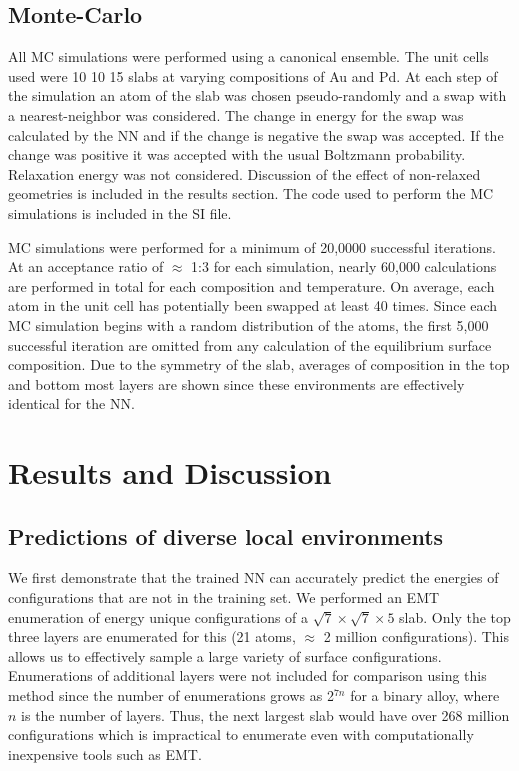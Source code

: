 \documentclass[12pt]{cmuthesis}
\begin{document}
\subsection{Monte-Carlo}
\label{sec:orgdf83274}
All MC simulations were performed using a canonical ensemble. The unit cells used were 10 \texttimes{} 10 \texttimes{} 15 slabs at varying compositions of Au and Pd. At each step of the simulation an atom of the slab was chosen pseudo-randomly and a swap with a nearest-neighbor was considered.  The change in energy for the swap was calculated by the NN and if the change is negative the swap was accepted. If the change was positive it was accepted with the usual Boltzmann probability. Relaxation energy was not considered. Discussion of the effect of non-relaxed geometries is included in the results section. The code used to perform the MC simulations is included in the SI file.

MC simulations were performed for a minimum of 20,0000 successful iterations. At an acceptance ratio of \(\approx\) 1:3 for each simulation, nearly 60,000 calculations are performed in total for each composition and temperature. On average, each atom in the unit cell has potentially been swapped at least 40 times. Since each MC simulation begins with a random distribution of the atoms, the first 5,000 successful iteration are omitted from any calculation of the equilibrium surface composition. Due to the symmetry of the slab, averages of composition in the top and bottom most layers are shown since these environments are effectively identical for the NN.

\section{Results and Discussion}
\label{sec:org895000d}
\subsection{Predictions of diverse local environments}
\label{sec:org5917417}
We first demonstrate that the trained NN can accurately predict the energies of configurations that are not in the training set.  We performed an EMT enumeration of energy unique configurations of a \(\sqrt{7} \times \sqrt{7} \times 5\) slab. Only the top three layers are enumerated for this (21 atoms, \(\approx\) 2 million configurations). This allows us to effectively sample a large variety of surface configurations. Enumerations of additional layers were not included for comparison using this method since the number of enumerations grows as 2\(^{7n}\) for a binary alloy, where \(n\) is the number of layers. Thus, the next largest slab would have over 268 million configurations which is impractical to enumerate even with computationally inexpensive tools such as EMT.
\end{document}
